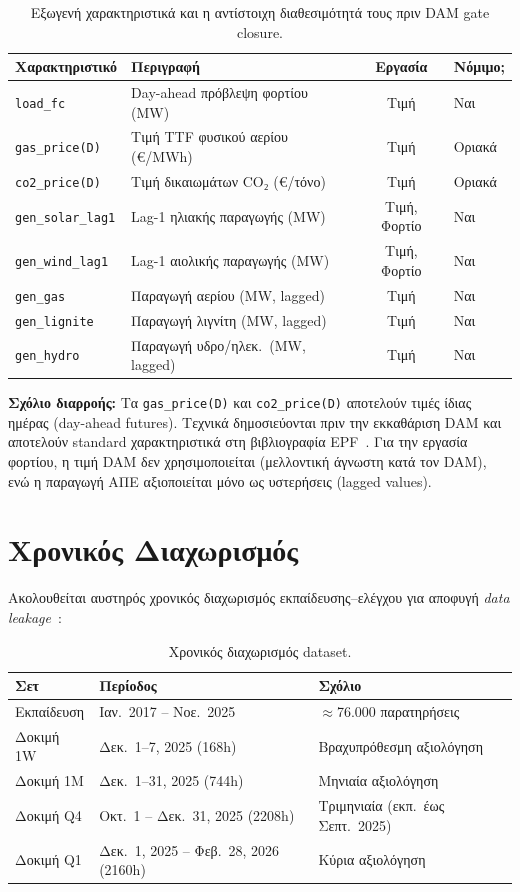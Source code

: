 \begin{table}[H]
\centering
\caption{Εξωγενή χαρακτηριστικά και η αντίστοιχη διαθεσιμότητά τους πριν DAM gate closure.}
\label{tab:exogenous}
\begin{tabular}{llcl}
\toprule
\textbf{Χαρακτηριστικό} & \textbf{Περιγραφή} & \textbf{Εργασία} & \textbf{Νόμιμο;} \\
\midrule
\texttt{load\_fc}       & Day-ahead πρόβλεψη φορτίου (MW) & Τιμή & Ναι \\
\texttt{gas\_price(D)}  & Τιμή TTF φυσικού αερίου (€/MWh) & Τιμή & Οριακά \\
\texttt{co2\_price(D)}  & Τιμή δικαιωμάτων CO₂ (€/τόνο) & Τιμή & Οριακά \\
\texttt{gen\_solar\_lag1} & Lag-1 ηλιακής παραγωγής (MW) & Τιμή, Φορτίο & Ναι \\
\texttt{gen\_wind\_lag1}  & Lag-1 αιολικής παραγωγής (MW) & Τιμή, Φορτίο & Ναι \\
\texttt{gen\_gas}       & Παραγωγή αερίου (MW, lagged) & Τιμή & Ναι \\
\texttt{gen\_lignite}   & Παραγωγή λιγνίτη (MW, lagged) & Τιμή & Ναι \\
\texttt{gen\_hydro}     & Παραγωγή υδρο/ηλεκ.\ (MW, lagged) & Τιμή & Ναι \\
\bottomrule
\end{tabular}
\end{table}

\noindent\textbf{Σχόλιο διαρροής:} Τα \texttt{gas\_price(D)} και \texttt{co2\_price(D)} αποτελούν
τιμές ίδιας ημέρας (day-ahead futures). Τεχνικά δημοσιεύονται πριν την εκκαθάριση DAM και αποτελούν
standard χαρακτηριστικά στη βιβλιογραφία EPF~\cite{lago2021}. Για την εργασία φορτίου, η τιμή DAM
δεν χρησιμοποιείται (μελλοντική άγνωστη κατά τον DAM), ενώ η παραγωγή ΑΠΕ αξιοποιείται μόνο ως
υστερήσεις (lagged values).


\section{Χρονικός Διαχωρισμός}
\label{sec:train_test_split}

Ακολουθείται αυστηρός χρονικός διαχωρισμός εκπαίδευσης--ελέγχου για αποφυγή
\textit{data leakage}~\cite{kaufman2012leakage}:

\begin{table}[H]
\centering
\caption{Χρονικός διαχωρισμός dataset.}
\label{tab:split}
\begin{tabular}{lll}
\toprule
\textbf{Σετ} & \textbf{Περίοδος} & \textbf{Σχόλιο} \\
\midrule
Εκπαίδευση & Ιαν.\ 2017 -- Νοε.\ 2025 & $\approx$76.000 παρατηρήσεις \\
Δοκιμή 1W  & Δεκ.\ 1--7, 2025 (168h) & Βραχυπρόθεσμη αξιολόγηση \\
Δοκιμή 1M  & Δεκ.\ 1--31, 2025 (744h) & Μηνιαία αξιολόγηση \\
Δοκιμή Q4  & Οκτ.\ 1 -- Δεκ.\ 31, 2025 (2208h) & Τριμηνιαία (εκπ.\ έως Σεπτ.\ 2025) \\
Δοκιμή Q1  & Δεκ.\ 1, 2025 -- Φεβ.\ 28, 2026 (2160h) & Κύρια αξιολόγηση \\
\bottomrule
\end{tabular}
\end{table}

